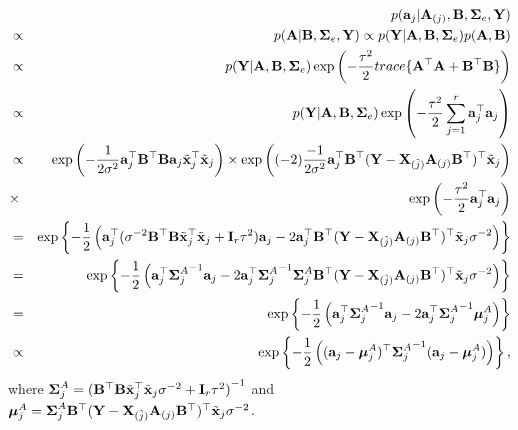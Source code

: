 \documentclass[]{book}
\begin{document}
\begin{eqnarray*}
    &&p({\bf a}_j|{\bf A}_{(j)},{\bf B},{\boldsymbol \Sigma}_e,{\bf Y})\\
    &\propto& p({\bf A}|{\bf B},{\boldsymbol \Sigma}_e,{\bf Y})\propto p({\bf Y}|{\bf A},{\bf B},{\boldsymbol \Sigma}_e)
    p({\bf A},{\bf B})\\
    &\propto& p({\bf Y}|{\bf A},{\bf B},{\boldsymbol \Sigma}_e) \exp \left(-\frac{\tau^2}{2} trace\{ {\bf A}^{{\top}}{\bf A}+{\bf B}^{{\top}}{\bf B}\}\right)
    \\
    &\propto& p({\bf Y}|{\bf A},{\bf B},{\boldsymbol \Sigma}_e) \exp \left(-\frac{\tau^2}{2} \sum_{j=1}^{r}{\bf a}_j^{{\top}}{\bf a}_j\right)\\
    &\propto& \exp\left(-\frac{1}{2\sigma^2}{\bf a}_j^{{\top}}{\bf B}^{{\top}}{\bf B}{\bf a}_j\tilde{{\bf x}}_j^{{\top}}\tilde{{\bf x}}_j\right)
    \times \exp\left((-2)\frac{-1}{2\sigma^2}{\bf a}_j^{{\top}}{\bf B}^{{\top}}({\bf Y}-{\bf X}_{(\tilde{j})}{\bf A}_{(j)}
    {\bf B}^{{\top}})^{{\top}}\tilde{{\bf x}}_j\right)\\
    &\times& \exp \left(-\frac{\tau^2}{2}{\bf a}_j^{{\top}}{\bf a}_j\right)\\
    &=& \exp\left\{-\frac{1}{2}\left({\bf a}_j^{{\top}}(\sigma^{-2}{\bf B}^{{\top}}{\bf B}\tilde{{\bf x}}_j^{{\top}}\tilde{{\bf x}}_j
    +{\bf I}_r\tau^2){\bf a}_j-2{\bf a}_j^{{\top}}{\bf B}^{{\top}}({\bf Y}-{\bf X}_{(\tilde{j})}{\bf A}_{(j)}
    {\bf B}^{{\top}})^{{\top}}\tilde{{\bf x}}_j\sigma^{-2}\right)\right\}\\
    &=& \exp\left\{-\frac{1}{2}\left({\bf a}_j^{{\top}}{{\boldsymbol \Sigma}_j^{A}}^{-1}
    {\bf a}_j-2{\bf a}_j^{{\top}}{{\boldsymbol \Sigma}_j^{A}}^{-1}{{\boldsymbol \Sigma}_j^{A}}{\bf B}^{{\top}}({\bf Y}-{\bf X}_{(\tilde{j})}{\bf A}_{(j)}
    {\bf B}^{{\top}})^{{\top}}\tilde{{\bf x}}_j\sigma^{-2}\right)\right\}\\
    &=& \exp\left\{-\frac{1}{2}\left({\bf a}_j^{{\top}}{{\boldsymbol \Sigma}_j^{A}}^{-1} {\bf a}_j-2{\bf a}_j^{{\top}}{{\boldsymbol \Sigma}_j^{A}}^{-1}{\boldsymbol \mu}_j^{A}\right)\right\}\\
    &\propto& \exp\left\{-\frac{1}{2}\left(({\bf a}_j-{\boldsymbol \mu}_j^{A})^{{\top}}{{\boldsymbol \Sigma}_j^{A}}^{-1}({\bf a}_j-{\boldsymbol \mu}_j^{A}) \right)\right\},
\end{eqnarray*}
where \({\boldsymbol \Sigma}_j^{A}={({\bf B}^{{\top}}{\bf B}\tilde{{\bf x}}_j^{{\top}}\tilde{{\bf x}}_j\sigma^{-2} +{\bf I}_r\tau^2)}^{-1}\) and
\({\boldsymbol \mu}_j^{A}={{\boldsymbol \Sigma}_j^{A}}{\bf B}^{{\top}}({\bf Y}-{\bf X}_{(\tilde{j})}{\bf A}_{(j)} {\bf B}^{{\top}})^{{\top}}\tilde{{\bf x}}_j\sigma^{-2}\).
\end{document}
